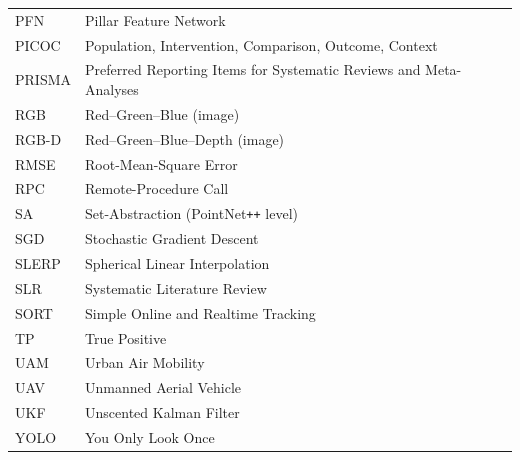 \begin{longtable}{ll}
PFN     & Pillar Feature Network \\
PICOC   & Population, Intervention, Comparison, Outcome, Context \\
PRISMA  & Preferred Reporting Items for Systematic Reviews and Meta-Analyses \\
RGB     & Red--Green--Blue (image) \\
RGB-D   & Red--Green--Blue--Depth (image) \\
RMSE    & Root-Mean-Square Error \\
RPC     & Remote-Procedure Call \\
SA      & Set-Abstraction (PointNet\texttt{++} level) \\
SGD     & Stochastic Gradient Descent \\
SLERP   & Spherical Linear Interpolation \\
SLR     & Systematic Literature Review \\
SORT    & Simple Online and Realtime Tracking \\
TP      & True Positive \\
UAM     & Urban Air Mobility \\
UAV     & Unmanned Aerial Vehicle \\
UKF     & Unscented Kalman Filter \\
YOLO    & You Only Look Once \\
\end{longtable}
